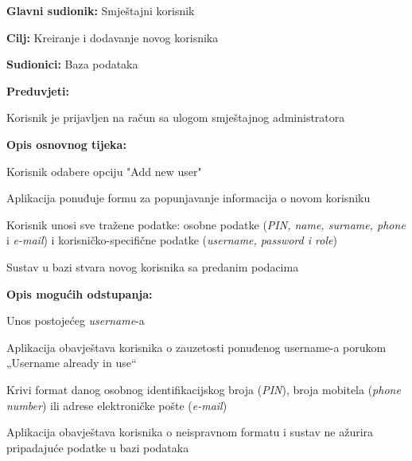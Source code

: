 					
					\noindent {}
					\begin{packed_item}
						\item \textbf{Glavni sudionik:} Smještajni korisnik
						\item  \textbf{Cilj:} Kreiranje i dodavanje novog korisnika
						\item  \textbf{Sudionici:} Baza podataka
						\item  \textbf{Preduvjeti:}
						\item[] \begin{packed_enum}
							\item Korisnik je prijavljen na račun sa ulogom smještajnog administratora
						\end{packed_enum}
						
						\item  \textbf{Opis osnovnog tijeka:}
						\item[] \begin{packed_enum}
							\item Korisnik odabere opciju "Add new user"
							\item Aplikacija ponuđuje formu za popunjavanje informacija o novom korisniku
							\item Korisnik unosi sve tražene podatke: osobne podatke (\textit{PIN, name, surname, phone} i \textit{e-mail}) i korisničko-specifične podatke (\textit{username, password i role})
							\item Sustav u bazi stvara novog korisnika sa predanim podacima
						\end{packed_enum}
						
						\item  \textbf{Opis mogućih odstupanja:}
						\item[] \begin{packed_item}
							\item[3.a] Unos postojećeg \textit{username}-a
							\item[] \begin{packed_enum}
								\item Aplikacija obavještava korisnika o zauzetosti ponuđenog username-a porukom „Username already in use“
									\end{packed_enum}
							\item[3.b] Krivi format danog osobnog identifikacijskog broja (\textit{PIN}), broja mobitela (\textit{phone number}) ili adrese elektroničke pošte (\textit{e-mail})
							\item[] \begin{packed_enum}
								\item Aplikacija obavještava korisnika o neispravnom formatu i sustav ne ažurira pripadajuće podatke u bazi podataka
									\end{packed_enum}
						\end{packed_item}
					\end{packed_item}
					
